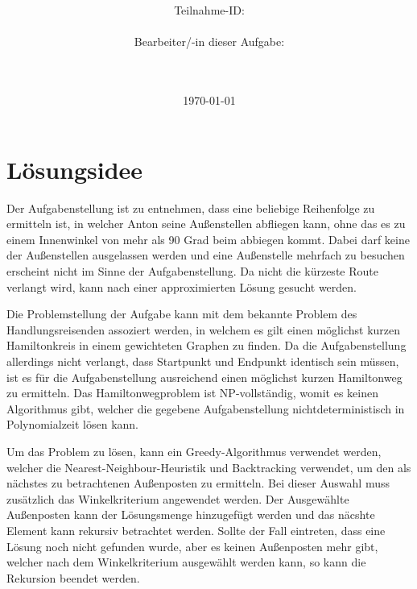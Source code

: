 \documentclass[a4paper,10pt,ngerman]{scrartcl}
\title{\textbf{\Huge\Aufgabe}}
\author{\LARGE Teilnahme-ID: \LARGE \TeilnahmeId \\\\
\LARGE Bearbeiter/-in dieser Aufgabe: \\
\LARGE \Name\\\\}
\date{\LARGE\today}
\begin{document}
    \maketitle
    \tableofcontents
    \vspace{0.5cm}
    \newpage
    
    \section{Lösungsidee}\label{sec:losungsidee}
    
    Der Aufgabenstellung ist zu entnehmen, dass eine beliebige Reihenfolge zu ermitteln ist, 
    in welcher Anton seine Außenstellen abfliegen kann, 
    ohne das es zu einem Innenwinkel von mehr als 90 Grad beim abbiegen kommt.
    Dabei darf keine der Außenstellen ausgelassen werden 
    und eine Außenstelle mehrfach zu besuchen erscheint nicht im Sinne der Aufgabenstellung.
    Da nicht die kürzeste Route verlangt wird, kann nach einer approximierten Lösung gesucht werden.
    
    Die Problemstellung der Aufgabe kann mit dem bekannte Problem des Handlungsreisenden assoziert werden,
    in welchem es gilt einen möglichst kurzen Hamiltonkreis in einem gewichteten Graphen zu finden.
    Da die Aufgabenstellung allerdings nicht verlangt, dass Startpunkt und Endpunkt identisch sein müssen, 
    ist es für die Aufgabenstellung ausreichend einen möglichst kurzen Hamiltonweg zu ermitteln.
    Das Hamiltonwegproblem ist NP-vollständig, womit es keinen Algorithmus gibt, 
    welcher die gegebene Aufgabenstellung nichtdeterministisch in Polynomialzeit lösen kann.
    
    Um das Problem zu lösen, kann ein Greedy-Algorithmus verwendet werden, 
    welcher die Nearest-Neighbour-Heuristik und Backtracking verwendet, 
    um den als nächstes zu betrachtenen Außenposten zu ermitteln. 
    Bei dieser Auswahl muss zusätzlich das Winkelkriterium angewendet werden.
    Der Ausgewählte Außenposten kann der Lösungsmenge hinzugefügt werden 
    und das näcshte Element kann rekursiv betrachtet werden.
    Sollte der Fall eintreten, dass eine Lösung noch nicht gefunden wurde, aber es keinen Außenposten mehr gibt, 
    welcher nach dem Winkelkriterium ausgewählt werden kann, so kann die Rekursion beendet werden.
    
\end{document}
